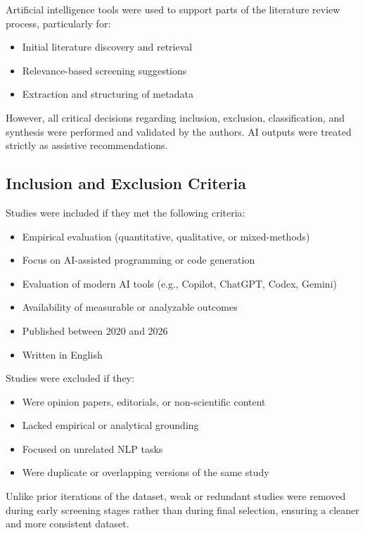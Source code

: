 \documentclass[conference]{IEEEtran}
\begin{document}
Artificial intelligence tools were used to support parts of the literature review process, particularly for:
\begin{itemize}
    \item Initial literature discovery and retrieval
    \item Relevance-based screening suggestions
    \item Extraction and structuring of metadata
\end{itemize}

However, all critical decisions regarding inclusion, exclusion, classification, and synthesis were performed and validated by the authors. AI outputs were treated strictly as assistive recommendations.

\subsection{Inclusion and Exclusion Criteria}

Studies were included if they met the following criteria:
\begin{itemize}
    \item Empirical evaluation (quantitative, qualitative, or mixed-methods)
    \item Focus on AI-assisted programming or code generation
    \item Evaluation of modern AI tools (e.g., Copilot, ChatGPT, Codex, Gemini)
    \item Availability of measurable or analyzable outcomes
    \item Published between 2020 and 2026
    \item Written in English
\end{itemize}

Studies were excluded if they:
\begin{itemize}
    \item Were opinion papers, editorials, or non-scientific content
    \item Lacked empirical or analytical grounding
    \item Focused on unrelated NLP tasks
    \item Were duplicate or overlapping versions of the same study
\end{itemize}

Unlike prior iterations of the dataset, weak or redundant studies were removed during early screening stages rather than during final selection, ensuring a cleaner and more consistent dataset.
\end{document}

